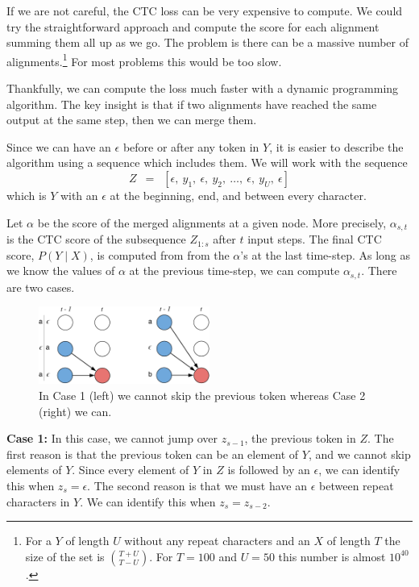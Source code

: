 If we are not careful, the CTC loss can be very expensive to compute. We could
try the straightforward approach and compute the score for each alignment
summing them all up as we go. The problem is there can be a massive number of
alignments.\footnote{For a $Y$ of length $U$ without any repeat characters and
an $X$ of length $T$ the size of the set is ${T + U \choose T - U}$. For
$T=100$ and $U=50$ this number is almost $10^{40}$.} For most problems this
would be too slow.

Thankfully, we can compute the loss much faster with a dynamic programming
algorithm. The key insight is that if two alignments have reached the same
output at the same step, then we can merge them.

Since we can have an $\epsilon$ before or after any token in $Y$, it is easier
to describe the algorithm using a sequence which includes them. We will work
with the sequence
\[
Z \enspace =\enspace [\epsilon, ~y_1, ~\epsilon, ~y_2,~ \ldots, ~\epsilon, ~y_U, ~\epsilon]
\]
which is $Y$ with an $\epsilon$ at the beginning, end, and between every
character.

Let $\alpha$ be the score of the merged alignments at a given node. More
precisely, $\alpha_{s, t}$ is the CTC score of the subsequence $Z_{1:s}$ after
$t$ input steps.  The final CTC score, $P(Y \mid X)$, is computed from from the
$\alpha$'s at the last time-step. As long as we know the values of $\alpha$ at
the previous time-step, we can compute $\alpha_{s, t}$. There are two cases.

\begin{figure}[ht!]
\centering
\includegraphics[width=0.5\textwidth]{background/figures/cases.pdf}
\caption{In Case 1 (left) we cannot skip the previous token whereas Case 2
    (right) we can.}
\end{figure}

{\bf Case 1:} In this case, we cannot jump over $z_{s-1}$, the previous token
in $Z$. The first reason is that the previous token can be an element of $Y$,
and we cannot skip elements of $Y$. Since every element of $Y$ in $Z$ is
followed by an $\epsilon$, we can identify this when $z_{s} = \epsilon$. The
second reason is that we must have an $\epsilon$ between repeat characters in
$Y$. We can identify this when $z_s = z_{s-2}$.

